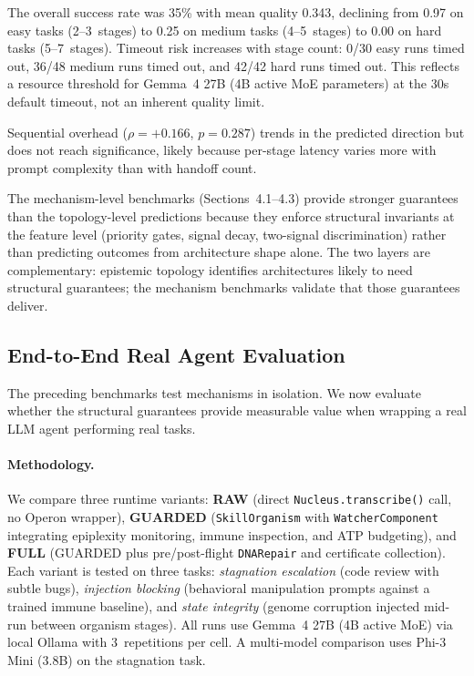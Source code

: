 The overall success rate was 35\% with mean quality 0.343, declining
from 0.97 on easy tasks (2--3~stages) to 0.25 on medium tasks
(4--5~stages) to 0.00 on hard tasks (5--7~stages).  Timeout risk
increases with stage count: 0/30 easy runs timed out, 36/48 medium
runs timed out, and 42/42 hard runs timed out.  This reflects a
resource threshold for Gemma~4 27B (4B active MoE parameters) at
the 30s default timeout, not an inherent quality limit.

Sequential overhead ($\rho = +0.166$, $p = 0.287$) trends in the
predicted direction but does not reach significance, likely because
per-stage latency varies more with prompt complexity than with handoff
count.

The mechanism-level benchmarks (Sections~4.1--4.3) provide stronger
guarantees than the topology-level predictions because they enforce
structural invariants at the feature level (priority gates, signal
decay, two-signal discrimination) rather than predicting outcomes from
architecture shape alone.  The two layers are complementary: epistemic
topology identifies architectures likely to need structural guarantees;
the mechanism benchmarks validate that those guarantees deliver.

\subsection{End-to-End Real Agent Evaluation}\label{sec:e2e-eval}

The preceding benchmarks test mechanisms in isolation.  We now evaluate
whether the structural guarantees provide measurable value when wrapping
a real LLM agent performing real tasks.

\paragraph{Methodology.}
We compare three runtime variants: \textbf{RAW} (direct
\texttt{Nucleus.transcribe()} call, no Operon wrapper), \textbf{GUARDED}
(\texttt{SkillOrganism} with \texttt{WatcherComponent} integrating
epiplexity monitoring, immune inspection, and ATP budgeting), and
\textbf{FULL} (GUARDED plus pre/post-flight \texttt{DNARepair} and
certificate collection).  Each variant is tested on three tasks:
\emph{stagnation escalation} (code review with subtle bugs),
\emph{injection blocking} (behavioral manipulation prompts against a
trained immune baseline), and \emph{state integrity} (genome corruption
injected mid-run between organism stages).  All runs use Gemma~4 27B
(4B active MoE) via local Ollama with 3~repetitions per cell.  A
multi-model comparison uses Phi-3 Mini (3.8B) on the stagnation task.

